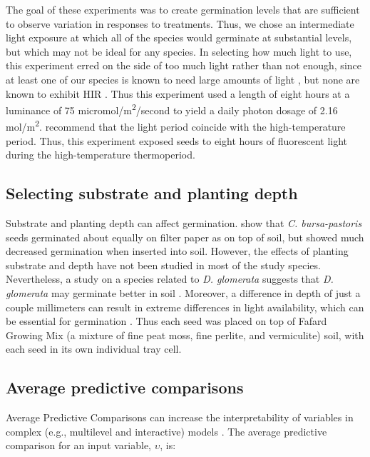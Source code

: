 \documentclass[12pt]{article}\usepackage[]{graphicx}\usepackage[]{color}
\begin{document}
	The goal of these experiments was to create germination levels that are sufficient to observe variation in responses to treatments. Thus, we chose an intermediate light exposure at which all of the species would germinate at substantial levels, but which may not be ideal for any species. In selecting how much light to use, this experiment erred on the side of too much light rather than not enough, since at least one of our species is known to need large amounts of light \parencite[\textit{Plantago major},][]{Pons1991}, but none are known to exhibit HIR \parencite[although a \textit{D. glomerata} subspecies in southern Europe does exhibit HIR, see][however, this subspecies is not thought to have been collected for this study]{Probert1986}. Thus this experiment used a length of eight hours at a luminance of 75 micromol/m\textsuperscript{2}/second to yield a daily photon dosage of 2.16 mol/m\textsuperscript{2}. \textcite{Baskin1998} recommend that the light period coincide with the high-temperature period. Thus, this experiment exposed seeds to eight hours of fluorescent light during the high-temperature thermoperiod. 
	
\subsection{Selecting substrate and planting depth} 
Substrate and planting depth can affect germination. \textcite{Popay1970} show that \textit{C. bursa-pastoris} seeds germinated about equally on filter paper as on top of soil, but showed much decreased germination when inserted into soil. However, the effects of planting substrate and depth have not been studied in most of the study species. Nevertheless, a study on a species related to \textit{D. glomerata} suggests that \textit{D. glomerata} may germinate better in soil \parencite{Andrews1974}. Moreover, a difference in depth of just a couple millimeters can result in extreme differences in light availability, which can be essential for germination \parencite{Tester1987}. Thus each seed was placed on top of Fafard Growing Mix (a mixture of fine peat moss, fine perlite, and vermiculite) soil, with each seed in its own individual tray cell.

\subsection{Average predictive comparisons} 
Average Predictive Comparisons can increase the interpretability of variables in complex (e.g., multilevel and interactive) models \parencite{Gelman2007}.  The average predictive comparison for an input variable, $\upsilon$, is: 
\end{document}
